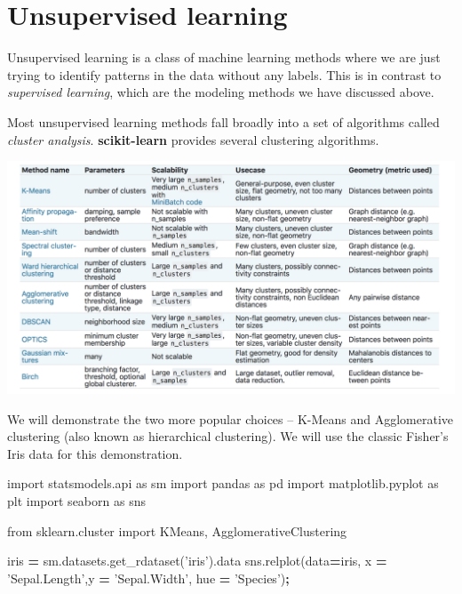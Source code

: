 \documentclass[
  letterpaper,
]{scrbook}
\newenvironment{Shaded}{\begin{snugshade}}{\end{snugshade}}
\newcommand{\ImportTok}[1]{#1}
\newcommand{\NormalTok}[1]{#1}
\newcommand{\OperatorTok}[1]{\textcolor[rgb]{0.81,0.36,0.00}{\textbf{#1}}}
\newcommand{\StringTok}[1]{\textcolor[rgb]{0.31,0.60,0.02}{#1}}
\begin{document}
\hypertarget{unsupervised-learning}{%
\section{Unsupervised learning}\label{unsupervised-learning}}

Unsupervised learning is a class of machine learning methods where we are just trying to identify patterns in the data without any labels. This is in contrast to \emph{supervised learning}, which are the modeling methods we have discussed above.

Most unsupervised learning methods fall broadly into a set of algorithms called \emph{cluster analysis}. \textbf{scikit-learn} provides several clustering algorithms.

\includegraphics{graphs/cluster_choice.png}

We will demonstrate the two more popular choices -- K-Means and Agglomerative clustering (also known as hierarchical clustering). We will use the classic Fisher's Iris data for this demonstration.

\begin{Shaded}
\begin{Highlighting}[]
\ImportTok{import}\NormalTok{ statsmodels.api }\ImportTok{as}\NormalTok{ sm}
\ImportTok{import}\NormalTok{ pandas }\ImportTok{as}\NormalTok{ pd}
\ImportTok{import}\NormalTok{ matplotlib.pyplot }\ImportTok{as}\NormalTok{ plt}
\ImportTok{import}\NormalTok{ seaborn }\ImportTok{as}\NormalTok{ sns}

\ImportTok{from}\NormalTok{ sklearn.cluster }\ImportTok{import}\NormalTok{ KMeans, AgglomerativeClustering}

\NormalTok{iris }\OperatorTok{=}\NormalTok{ sm.datasets.get_rdataset(}\StringTok{'iris'}\NormalTok{).data}
\NormalTok{sns.relplot(data}\OperatorTok{=}\NormalTok{iris, x }\OperatorTok{=} \StringTok{'Sepal.Length'}\NormalTok{,y }\OperatorTok{=} \StringTok{'Sepal.Width'}\NormalTok{, hue }\OperatorTok{=} \StringTok{'Species'}\NormalTok{)}\OperatorTok{;}
\end{Highlighting}
\end{Shaded}
\end{document}
